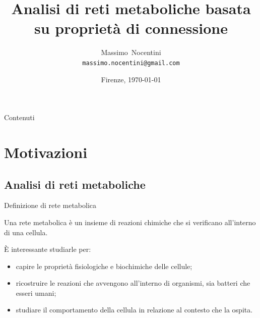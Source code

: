 \documentclass{beamer}
\title[Analisi di reti metaboliche] {Analisi di reti metaboliche
  basata su propriet\`a di connessione}
\author[Massimo Nocentini] %
{Massimo~Nocentini\\\texttt{massimo.nocentini@gmail.com}}
\institute[UniversitaStudiFirenze] %
 { Universit\`a degli Studi di Firenze }
\date[Tesi20120222] %
{Firenze, \today}
\begin{document}
\begin{frame}[plain]
  \titlepage
\end{frame}

\begin{frame}{Contenuti}
  \tableofcontents[pausesections]
\end{frame}





\section{Motivazioni}

\subsection{Analisi di reti metaboliche}

\begin{frame}{Definizione di rete metabolica}
  \begin{definition}
    Una rete metabolica \`e un insieme di reazioni chimiche che si
    verificano all'interno di una cellula.
  \end{definition}
  \`E interessante studiarle per:
  \begin{itemize}
  \item capire le propriet\`a fisiologiche e biochimiche delle
    cellule;
  \item ricostruire le reazioni che avvengono all'interno di
    organismi, sia batteri che esseri umani;
  \item studiare il comportamento della cellula in relazione al
    contesto che la ospita.
  \end{itemize}
\end{frame}
\end{document}
